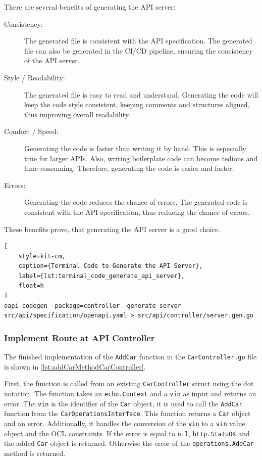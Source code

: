 There are several benefits of generating the API server:
\begin{description}
    \item[Consistency:] The generated file is consistent with the API specification.
        The generated file can also be generated in the CI/CD pipeline, ensuring the consistency of the API server. 
    \item[Style / Readability:] The generated file is easy to read and understand.
        Generating the code will keep the code style consistent, keeping comments and structures aligned, thus improving overall readability.
    \item[Comfort / Speed:] Generating the code is faster than writing it by hand.
        This is especially true for larger APIs.
        Also, writing boilerplate code can become tedious and time-consuming.
        Therefore, generating the code is easier and faster.
    \item[Errors:] Generating the code reduces the chance of errors.
        The generated code is consistent with the API specification, thus reducing the chance of errors.
\end{description}
These benefits prove, that generating the API server is a good choice.

\begin{lstlisting}[
    style=kit-cm,
    caption={Terminal Code to Generate the API Server},
    label={lst:terminal_code_generate_api_server},
    float=h
]
oapi-codegen -package=controller -generate server  src/api/specification/openapi.yaml > src/api/controller/server.gen.go
\end{lstlisting}

\subsubsection*{Implement Route at API Controller}
The finished implementation of the \texttt{AddCar} function in the \texttt{CarController.go} file is shown in \autoref{lst:addCarMethodCarController}.

First, the function is called from an existing \texttt{CarController} struct using the dot notation.
The function takes an \texttt{echo.Context} and a \texttt{vin} as input and returns an error.
The \texttt{vin} is the identifier of the \texttt{Car} object, it is used to call the \texttt{AddCar} function from the \texttt{CarOperationsInterface}.
This function returns a \texttt{Car} object and an error.
Additionally, it handles the conversion of the \texttt{vin} to a \texttt{vin} value object and the OCL constraints.
If the error is equal to \texttt{nil}, \texttt{http.StatuOK} and the added \texttt{Car} object is returned.
Otherwise the error of the \texttt{operations.AddCar} method is returned.

